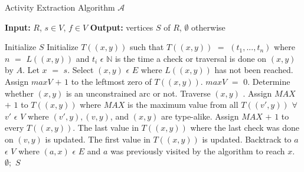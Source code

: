 \begin{algorithm}[H]
    \caption{Activity Extraction Algorithm ${\mathcal A}$ \cite{Malinao2017, Sulla2023}}
    \label{ActivityExtraction}
    \begin{algorithmic}
        \State \textbf{Input:} $ R $, $ s \in V $, $ f \in V $
        \State \textbf{Output:} vertices $ S $ of $ R $, $ \emptyset $ otherwise
    \end{algorithmic}
    \begin{algorithmic}[1]
        \State Initialize $ S $
            \State Initialize $ T((x,y)) $ such that $ T((x,y)) $ $ = $ $ (t_1, ..., t_n) $ where $ n $ $ = $ $ L((x,y)) $ and $ t_i $ $ \epsilon $ $ \mathbb{N} $ is the time a check or traversal is done on $ (x,y) $ by $ A $.
        \EndFor
        \State Let $ x $ $ = $ $ s $.
            \State Select $ (x,y) $ $ \epsilon $ $ E $ where $ L((x,y)) $ has not been reached.
                \State Assign $ maxV $ $ + $ $ 1 $ to the leftmost zero of $ T((x,y)) $. 
            \Else
                \State $ maxV $ $ = $ $ 0 $.
            \EndIf
            \State Determine whether $ (x,y) $ is an unconstrained arc or not.
                \State Traverse $ (x,y) $ .
                \State Assign $ MAX $ $ + $ $ 1 $ to $ T((x,y)) $ where $ MAX $ is the maximum value from all $ T((v',y)) $ $ \forall $ $ v' $ $ \epsilon $ $ V $ where $ (v',y),(v,y) $, and $ (x,y) $ are type-alike.
                    \State Assign $ MAX $ $ + $ $ 1 $ to every $ T((x,y)) $.
                        \State The last value in $ T((x,y)) $ where the last check was done on $ (v,y) $ is updated.
                        \State The first value in $ T((x,y)) $ is updated.
                    \EndIf
                \EndFor
                \State Backtrack to $ a $ $ \epsilon $ $ V $ where $ (a,x) $ $ \epsilon $ $ E $ and $ a $ was previously visited by the algorithm to reach $ x $.
            \EndIf
        \EndWhile
            \State \Return $ \emptyset; $
        \Else
            \State \Return $ S $
        \EndIf
    \end{algorithmic}
\end{algorithm}
